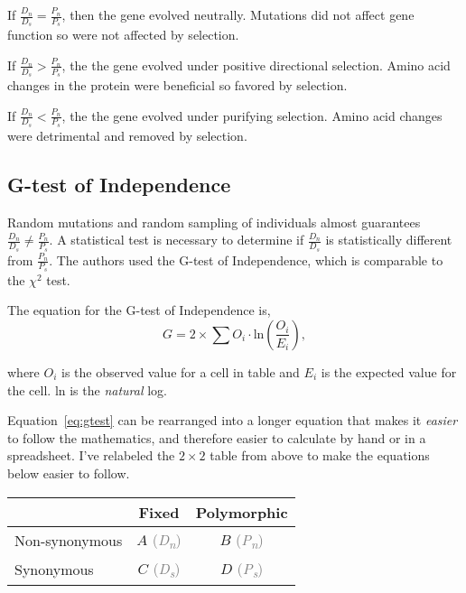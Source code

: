 \documentclass[12pt, addpoints, hidelinks]{exam}
\begin{document}
If $\frac{D_n}{D_s} = \frac{P_n}{P_s}$, then the gene evolved neutrally. Mutations did not affect gene function so were not affected by selection.

If $\frac{D_n}{D_s} > \frac{P_n}{P_s}$, the the gene evolved under positive directional selection. Amino acid changes in the protein were beneficial so favored by selection.

If $\frac{D_n}{D_s} < \frac{P_n}{P_s}$, the the gene evolved under purifying selection. Amino acid changes were detrimental and removed by selection.

\subsection*{G-test of Independence}

Random mutations and random sampling of individuals almost guarantees $\frac{D_n}{D_s} \ne\frac{P_n}{P_s}$. A statistical test is necessary to determine if $\frac{D_n}{D_s}$ is statistically different from $\frac{P_n}{P_s}$. The authors used the G-test of Independence, which is comparable to the $\chi^2$ test.

\bigskip

The equation for the G-test of Independence is,
\begin{equation}\label{eq:gtest}
G = 2 \times \sum O_i \cdot \mathrm{ln}\left(\dfrac{O_i}{E_i}\right),
\end{equation}

where $O_i$ is the observed value for a cell in table and $E_i$ is the expected value for the cell. ln is the \emph{natural} log.  

Equation~\ref{eq:gtest} can be rearranged into a longer equation that makes it \emph{easier} to follow the mathematics, and therefore easier to calculate by hand or in a spreadsheet. I've relabeled the $2\times2$ table from above to make the equations below easier to follow. 

\begin{tabular}{@{}lcc@{}}
\toprule
 & Fixed & Polymorphic \\
\midrule
Non-synonymous	&	
$A$ \textcolor{gray}{(\textit{D\textsubscript{n}})} &	
$B$ \textcolor{gray}{(\textit{P\textsubscript{n}})} \\
Synonymous		&	
$C$ \textcolor{gray}{(\textit{D\textsubscript{s}})}	&	
$D$ \textcolor{gray}{(\textit{P\textsubscript{s}})} \\
\bottomrule
\end{tabular}
\end{document}
